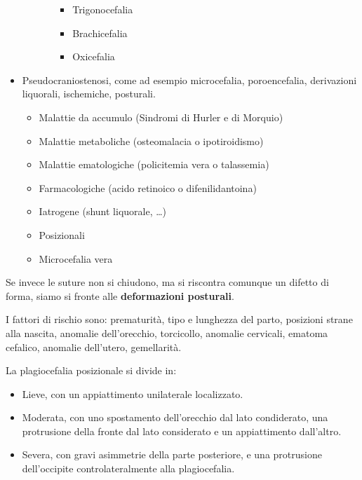 \begin{itemize}
\begin{itemize}
\begin{itemize}
\begin{itemize}
			\item Trigonocefalia																			%
			\item Brachicefalia																			%
			\item Oxicefalia																				%
			\end{itemize}																				%
		\end{itemize}																					%
	\end{itemize}																						%
\item Pseudocraniostenosi, come ad esempio microcefalia, poroencefalia, 						%
derivazioni liquorali, ischemiche, posturali. 															%
	\begin{itemize}																						%
	\item Malattie da accumulo (Sindromi di Hurler e di Morquio)									%
	\item Malattie metaboliche (osteomalacia o ipotiroidismo)										%
	\item Malattie ematologiche (policitemia vera o talassemia)									%
	\item Farmacologiche (acido retinoico o difenilidantoina)										%
	\item Iatrogene (shunt liquorale, \dots)															%
	\item Posizionali																						%
	\item Microcefalia vera																				%
	\end{itemize}																						%
\end{itemize}																							%
Se invece le suture non si chiudono, ma si riscontra comunque un difetto di forma, siamo si fronte alle \textbf{deformazioni posturali}.

I fattori di rischio sono: prematurità, tipo e lunghezza del parto, posizioni strane alla nascita, anomalie dell'orecchio, torcicollo,
anomalie cervicali, ematoma cefalico, anomalie dell'utero, gemellarità.

La plagiocefalia posizionale si divide in:
\begin{itemize}
\item Lieve, con un appiattimento unilaterale localizzato.
\item Moderata, con uno spostamento dell'orecchio dal lato condiderato, una protrusione della fronte dal lato considerato e un
appiattimento dall'altro.
\item Severa, con gravi asimmetrie della parte posteriore, e una protrusione dell'occipite controlateralmente alla plagiocefalia.
\end{itemize}

